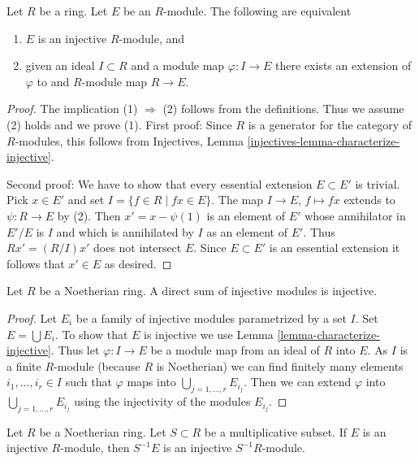 \begin{lemma}
\label{lemma-characterize-injective}
Let $R$ be a ring. Let $E$ be an $R$-module. The following are equivalent
\begin{enumerate}
\item $E$ is an injective $R$-module, and
\item given an ideal $I \subset R$ and a module map $\varphi : I \to E$
there exists an extension of $\varphi$ to and $R$-module map $R \to E$.
\end{enumerate}
\end{lemma}

\begin{proof}
The implication (1) $\Rightarrow$ (2) follows from the definitions.
Thus we assume (2) holds and we prove (1).
First proof: Since $R$ is a generator for the category of $R$-modules,
this follows from
Injectives, Lemma \ref{injectives-lemma-characterize-injective}.

\medskip\noindent
Second proof: We have to show that every essential extension $E \subset E'$
is trivial. Pick $x \in E'$ and set $I = \{f \in R \mid fx \in E\}$.
The map $I \to E$, $f \mapsto fx$ extends to $\psi : R \to E$ by (2).
Then $x' = x - \psi(1)$ is an element of $E'$ whose annihilator in
$E'/E$ is $I$ and which is annihilated by $I$ as an element of $E'$.
Thus $Rx' = (R/I)x'$ does not intersect $E$. Since $E \subset E'$
is an essential extension it follows that $x' \in E$ as desired.
\end{proof}

\begin{lemma}
\label{lemma-sum-injective-modules}
Let $R$ be a Noetherian ring. A direct sum of injective modules
is injective.
\end{lemma}

\begin{proof}
Let $E_i$ be a family of injective modules parametrized by a set $I$.
Set $E = \bigcup E_i$. To show that $E$ is injective we use
Lemma \ref{lemma-characterize-injective}.
Thus let $\varphi : I \to E$ be a module map from an ideal of $R$
into $E$. As $I$ is a finite $R$-module (because $R$ is Noetherian)
we can find finitely many elements $i_1, \ldots, i_r \in I$
such that $\varphi$ maps into $\bigcup_{j = 1, \ldots, r} E_{i_j}$.
Then we can extend $\varphi$ into $\bigcup_{j = 1, \ldots, r} E_{i_j}$
using the injectivity of the modules $E_{i_j}$.
\end{proof}

\begin{lemma}
\label{lemma-localization-injective-modules}
Let $R$ be a Noetherian ring. Let $S \subset R$ be a multiplicative
subset. If $E$ is an injective $R$-module, then $S^{-1}E$ is an
injective $S^{-1}R$-module.
\end{lemma}

